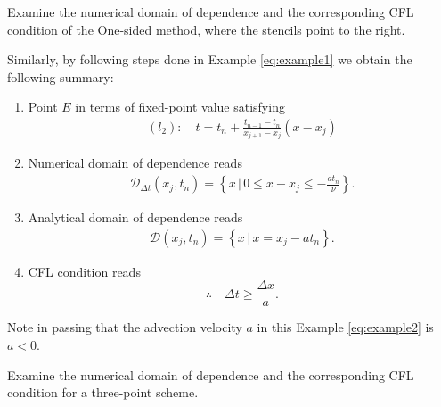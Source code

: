 \documentclass[12pt]{article}
\begin{document}
\pagebreak
\begin{example}\label{eq:example2}
	Examine the numerical domain of dependence 
	and the corresponding CFL condition of the One-sided method, 
	where the stencils point to the right.
\end{example}

Similarly, by following steps done in Example \ref{eq:example1} we obtain the following summary:

\begin{enumerate}
	\item Point $E$ in terms of fixed-point value satisfying
	      \begin{align}
		      (l_2):\quad t = t_n + \frac{t_{n-1}-t_n}{x_{j+1}-x_j}\left(x-x_{j}\right)
	      \end{align}
	\item Numerical domain of dependence reads
	      \begin{align}
		      \mathcal{D}_{\Delta t}\left(x_j,t_n\right)
		      =  \left\{ x \, \Big|\, 0 \leq x - x_j \leq -\frac{at_n}{\nu} \right\}.
	      \end{align}
	      
	\item Analytical domain of dependence reads
	      \begin{align}
		      \mathcal{D}\left(x_j,t_n\right)
		      =  \left\{ x \, \Big|\, x = x_{j} - at_n \right\} .
	      \end{align}
	      
	\item CFL condition reads
	      \begin{equation}
		      \therefore\quad
		      \boxed{
			      \Delta t \geq \frac{\Delta x}{a}.
		      }
	      \end{equation}
\end{enumerate}
Note in passing that the advection velocity $a$ in this Example \ref{eq:example2} is $a<0$.

\pagebreak
\begin{example}\label{eq:example3}
	Examine the numerical domain of dependence 
	and the corresponding CFL condition for a three-point scheme.
\end{example}
\end{document}
